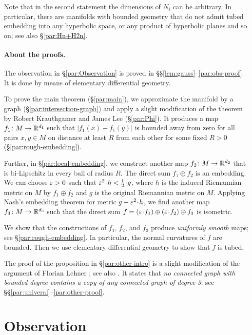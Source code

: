 \arxiv{\documentclass[a4paper,10pt]{article}}{\documentclass{mjm}}
\begin{document}
Note that in the second statement the dimensions of $N_i$ can be arbitrary.
In particular, there are manifolds with bounded geometry that do not admit tubed embedding into any hyperbolic space, or any product of hyperbolic planes and so on; see also §\ref{par:Hn+H2n}.

\paragraph{About the proofs.}
The observation in §\ref{par:Observation} is proved in §§\ref{lem:gauss}--\ref{par:obs-proof}.
It is done by means of elementary differential geometry.

To prove the main theorem (§\ref{par:main}), we approximate the manifold by a graph (§\ref{par:intersection-graph}) and apply a slight modification of 
the theorem by Robert Krauthgamer and James Lee \cite{krauthgamer-lee0,krauthgamer-lee1} (§\ref{par:Phi}).
It produces a map $f_1\colon M\to \mathbb{R}^{d_1}$ such that $|f_1(x)-f_1(y)|$ is bounded away from zero for all pairs $x,y\in M$ on distance at least $R$ from each other for some fixed $R>0$ (§\ref{par:rough-embedding}).

Further, in §\ref{par:local-embedding}, we construct another map $f_2\colon M\to \mathbb{R}^{d_2}$ that is bi-Lipschitz in every ball of radius $R$.
The direct sum $f_1\oplus f_2$ is an embedding.
We can choose $\varepsilon>0$ such that $\eps^2\cdot h<\tfrac12\cdot g$,
where $h$ is the induced Riemannian metric on $M$ by $f_1\oplus f_2$ and $g$ is the original Riemannian metric on $M$.
Applying Nash's embedding theorem for metric $g-\eps^2\cdot h$,
we find another map $f_3\colon M\to \mathbb{R}^{d_3}$ such that the direct sum $f=(\eps\cdot f_1)\oplus (\eps\cdot  f_2)\oplus f_3$ is isometric.

We show that the constructions of $f_1$, $f_2$, and $f_3$ produce \textit{uniformly smooth} maps; see  §\ref{par:rough-embedding}.
In particular, the normal curvatures of $f$ are bounded.
Then we use elementary differential geometry to show that $f$ is tubed. 

The proof of the proposition in §\ref{par:other-intro} is a slight modification of the argument of Florian Lehner \cite[1.2]{lehner}; see also \cite{462670}. 
It states that \textit{no connected graph with bounded degree contains a copy of any connected graph of degree 3}; see §§\ref{par:univeral}--\ref{par:other-proof}.

\section*{Observation}
\end{document}
